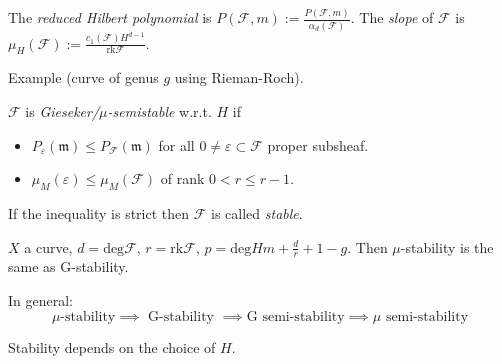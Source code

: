 The {\it reduced Hilbert polynomial} is
$P(\mathcal{F},m):=\frac{P(\mathcal{F},m)}{\alpha_d(\mathcal{F})}$. The {\it
slope} of $\mathcal{F}$ is
$\mu_H(\mathcal{F}):=\frac{c_1(\mathcal{F})H^{d-1}}{\text{rk}\mathcal{F}}$.

Example (curve of genus $g$ using Rieman-Roch).

\begin{definition}
\label{definition-Gieseker-and-mu-stability}
$\mathcal{F}$ is {\it Gieseker/$\mu$-semistable} w.r.t. $H$ if
\begin{itemize}
\item $P_\varepsilon(\mathfrak{m})\leq P_{\mathcal{F}}(\mathfrak{m})$ for all $0
\neq  \varepsilon \subset \mathcal{F}$ proper subsheaf.
\item $\mu_{M}(\varepsilon) \leq  \mu_{M}(\mathcal{F})$ of rank $0<r \leq r-1$.
\end{itemize}
If the inequality is strict then $\mathcal{F}$ is called {\it stable}.
\end{definition}

\begin{example}
\label{example-G-and-mu-stability-coincide-in-curve}
$X$ a curve, $d=\text{deg}\mathcal{F}$, $r=\text{rk}\mathcal{F}$,
$p=\text{deg}Hm+\frac{d}{r}+1-g$. Then $\mu$-stability is the same as
G-stability.
\end{example}
In general:
$$
\mu\text{-stability}\implies \text{ G-stability }\implies \text{G semi-stability
}\implies \mu \text{ semi-stability}
$$
\begin{remark}
\label{remark-stability-depends-on-H}
Stability depends on the choice of $H$.
\end{remark}

